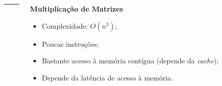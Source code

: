 \documentclass{beamer}
\begin{document}
\begin{frame}
\begin{columns}
\begin{column}{0.33\textwidth}
            \end{column}

            \begin{column}{0.01\textwidth}
                \rule{.1mm}{0.75\textheight}
            \end{column}

            \begin{column}{0.33\textwidth}

                \begin{center}
                    \textbf{Multiplicação de Matrizes}
                \end{center}

                \begin{itemize}
                    \footnotesize
                    \item Complexidade: $O(n^3)$;
                    \item Poucas instruções;
                    \item Bastante acesso à memória contígua (depende da \textit{cache});
                    \item Depende da latência de acesso à memória.
                \end{itemize}

            \end{column}
        \end{columns}
    \end{frame}
\end{document}
